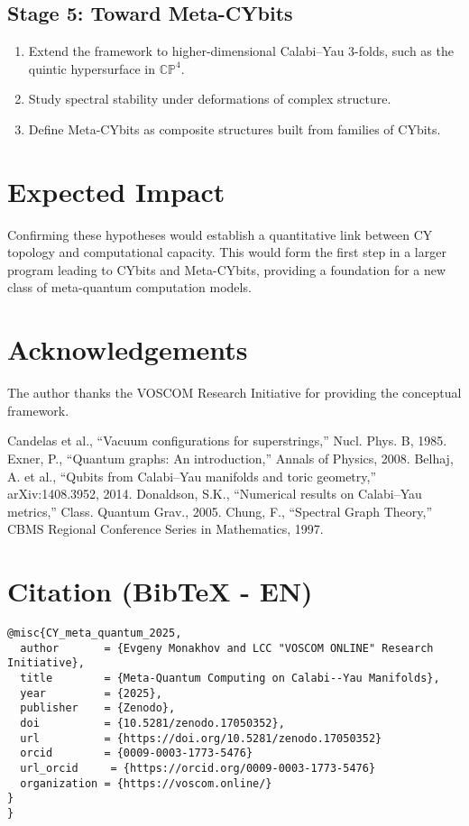 \documentclass[12pt,a4paper]{article}
\begin{document}
\subsection{Stage 5: Toward Meta-CYbits}
\begin{enumerate}
\item Extend the framework to higher-dimensional Calabi--Yau 3-folds, 
such as the quintic hypersurface in $\mathbb{CP}^4$.  
\item Study spectral stability under deformations of complex structure.  
\item Define Meta-CYbits as composite structures built from families of CYbits.  
\end{enumerate}

\section{Expected Impact}
Confirming these hypotheses would establish 
a quantitative link between CY topology and computational capacity. 
This would form the first step in a larger program 
leading to CYbits and Meta-CYbits, 
providing a foundation for a new class of meta-quantum computation models.  

\section*{Acknowledgements}
The author thanks the VOSCOM Research Initiative 
for providing the conceptual framework.

\begin{thebibliography}{9}
Candelas et al., ``Vacuum configurations for superstrings,'' 
Nucl. Phys. B, 1985.
Exner, P., ``Quantum graphs: An introduction,'' 
Annals of Physics, 2008.
Belhaj, A. et al., ``Qubits from Calabi--Yau manifolds and toric geometry,'' 
arXiv:1408.3952, 2014.
Donaldson, S.K., ``Numerical results on Calabi--Yau metrics,'' 
Class. Quantum Grav., 2005.
Chung, F., ``Spectral Graph Theory,'' 
CBMS Regional Conference Series in Mathematics, 1997.
\end{thebibliography}

\section*{Citation (BibTeX - EN)}
\begin{verbatim}
@misc{CY_meta_quantum_2025,
  author       = {Evgeny Monakhov and LCC "VOSCOM ONLINE" Research Initiative},
  title        = {Meta-Quantum Computing on Calabi--Yau Manifolds},
  year         = {2025},
  publisher    = {Zenodo},
  doi          = {10.5281/zenodo.17050352},
  url          = {https://doi.org/10.5281/zenodo.17050352}
  orcid		   = {0009-0003-1773-5476}
  url_orcid     = {https://orcid.org/0009-0003-1773-5476}
  organization = {https://voscom.online/}
}
}
\end{verbatim}
\end{document}

